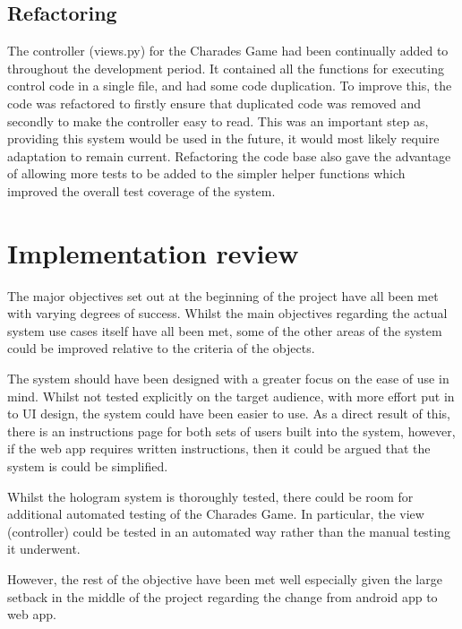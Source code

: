 \subsection{Refactoring}
The controller (views.py) for the Charades Game had been continually added to throughout the development period. It contained all the functions for executing control code in a single file, and had some code duplication. To improve this, the code was refactored to firstly ensure that duplicated code was removed and secondly to make the controller easy to read. This was an important step as, providing this system would be used in the future, it would most likely require adaptation to remain current. Refactoring the code base also gave the advantage of allowing more tests to be added to the simpler helper functions which improved the overall test coverage of the system.

\newpage

\section{Implementation review}
The major objectives set out at the beginning of the project have all been met with varying degrees of success. Whilst the main objectives regarding the actual system use cases itself have all been met, some of the other areas of the system could be improved relative to the criteria of the objects. 

The system should have been designed with a greater focus on the ease of use in mind. Whilst not tested explicitly on the target audience, with more effort put in to UI design, the system could have been easier to use. As a direct result of this, there is an instructions page for both sets of users built into the system, however, if the web app requires written instructions, then it could be argued that the system is could be simplified.

Whilst the hologram system is thoroughly tested, there could be room for additional automated testing of the Charades Game. In particular, the view (controller) could be tested in an automated way rather than the manual testing it underwent.

However, the rest of the objective have been met well especially given the large setback in the middle of the project regarding the change from android app to web app.